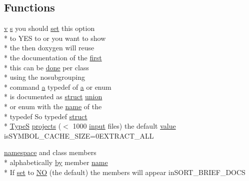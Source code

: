 \subsection*{Functions}
\begin{DoxyCompactItemize}
\item 
\hyperlink{glext_8h_a14cfbe2fc2234f5504618905b69d1e06}{v} \hyperlink{glext_8h_ad585a1393cfa368fa9dc3d8ebff640d5}{s} you should \hyperlink{analyze_raw_8m_a11671e12e7b3fc5881313758d6cc0b45}{set} this option \\*
to Y\-E\-S to or you want to show \\*
the then doxygen will reuse \\*
the documentation of the \hyperlink{glext_8h_a970a385f6f880f2b620451db4ca4299a}{first} \\*
this can be \hyperlink{qxtslotjob_8h_afd848a85523ad0ba77464879add9c332}{done} per class \\*
using the nosubgrouping \\*
command \hyperlink{glext_8h_ac8729153468b5dcf13f971b21d84d4e5}{a} typedef of \hyperlink{glext_8h_ac8729153468b5dcf13f971b21d84d4e5}{a} or enum \\*
is documented as \hyperlink{sdlgamepad_8dox_aba655c5729da86df745f0c8e7f9ba8d2}{struct} \hyperlink{sdlgamepad_8dox_a68000add3c95d09ceb97c3079515907d}{union} \\*
or enum with the \hyperlink{glext_8h_ad977737dfc9a274a62741b9500c49a32}{name} of the \\*
typedef So typedef \hyperlink{sdlgamepad_8dox_aba655c5729da86df745f0c8e7f9ba8d2}{struct} \\*
\hyperlink{sdlgamepad_8dox_a25dd1c015abaf1e4f2c6879012f4f170}{Type\-S} \hyperlink{sdlgamepad_8dox_a015310e1bd6d672828fcda81e432aa09}{projects} ($<$ 1000 \hyperlink{glext_8h_ad3c78daa7d8673f71649d4840c641779}{input} files) the default \hyperlink{glext_8h_aa0e2e9cea7f208d28acda0480144beb0}{value} is\-S\-Y\-M\-B\-O\-L\-\_\-\-C\-A\-C\-H\-E\-\_\-\-S\-I\-Z\-E=0\-E\-X\-T\-R\-A\-C\-T\-\_\-\-A\-L\-L
\item 
\hyperlink{sdlgamepad_8dox_a525af27f938795208a10ce5261c76978}{namespace} and class members \\*
alphabetically \hyperlink{glext_8h_aee54e9aab2837a54be2ff5fb1c073bd2}{by} member \hyperlink{glext_8h_ad977737dfc9a274a62741b9500c49a32}{name} \\*
If \hyperlink{analyze_raw_8m_a11671e12e7b3fc5881313758d6cc0b45}{set} to \hyperlink{sdlgamepad_8dox_a0f6a46245280dc38baf9600906aa1393}{N\-O} (the default) the members will appear in\-S\-O\-R\-T\-\_\-\-B\-R\-I\-E\-F\-\_\-\-D\-O\-C\-S
\end{DoxyCompactItemize}
